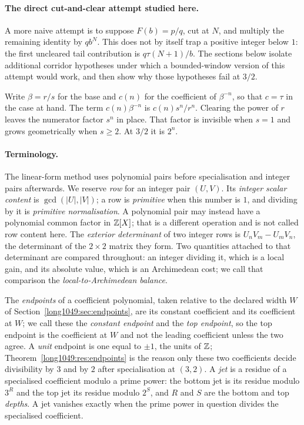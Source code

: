 \documentclass[11pt]{article}
\begin{document}
\paragraph{The direct cut-and-clear attempt studied here.}
A more naive attempt is to suppose $F(b)=p/q$, cut at $N$, and multiply the
remaining identity by $qb^N$.  This does not by itself trap a positive integer
below $1$: the first uncleared tail contribution is
$q\tau(N+1)/b$.  The sections below isolate additional corridor hypotheses
under which a bounded-window version of this attempt would work, and then show
why those hypotheses fail at $3/2$.

Write $\beta=r/s$ for the base and $c(n)$ for the coefficient of $\beta^{-n}$,
so that $c=\tau$ in the case at hand.  The term $c(n)\beta^{-n}$ is
$c(n)s^{n}/r^{n}$.  Clearing the
power of $r$ leaves the numerator factor $s^{n}$ in place.  That factor is
invisible when $s=1$ and grows geometrically when $s\ge2$.  At $3/2$ it is
$2^{n}$.

\paragraph{Terminology.}
The linear-form method uses polynomial pairs before specialisation and integer
pairs afterwards.  We reserve \emph{row} for an integer pair $(U,V)$.  Its
\emph{integer scalar content} is $\gcd(|U|,|V|)$; a row is \emph{primitive}
when this number is $1$, and dividing by it is \emph{primitive normalisation}.
A polynomial pair may instead have a polynomial common factor in $\mathbb{Z}[X]$;
that is a different operation and is not called row content here.  The
\emph{exterior determinant} of two integer rows is
$U_{n}V_{m}-U_{m}V_{n}$, the determinant of the $2\times2$ matrix they form.
Two quantities attached to that determinant are compared throughout: an
integer dividing it, which is a local gain, and its absolute value, which is an
Archimedean cost; we call that comparison the \emph{local-to-Archimedean
balance}.

The \emph{endpoints} of a coefficient polynomial, taken relative to
the declared width $W$ of Section~\ref{long1049:sec:endpoints}, are its constant
coefficient and its coefficient at $W$; we call these the \emph{constant
endpoint} and the \emph{top endpoint}, so the top endpoint is the coefficient
at $W$ and not the leading coefficient unless the two agree.  A \emph{unit}
endpoint is one equal
to $\pm1$, the units of $\mathbb{Z}$; Theorem~\ref{long1049:res:endpoints} is the reason only these
two coefficients decide divisibility by $3$ and by $2$ after specialisation at
$(3,2)$.  A \emph{jet} is a
residue of a specialised coefficient modulo a prime power: the bottom jet is
its residue modulo $3^{R}$ and the top jet its residue modulo $2^{S}$, and $R$
and $S$ are the bottom and top \emph{depths}.  A jet vanishes exactly when the
prime power in question divides the specialised coefficient.
\end{document}
